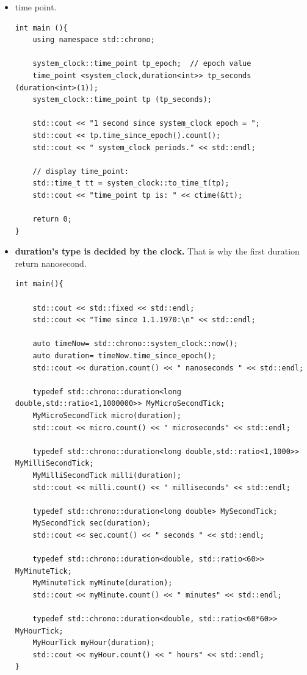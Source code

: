 \documentclass[a4paper,11pt,twoside]{book}
\begin{document}
\begin{itemize}
	\item time point.
\begin{lstlisting}[numbers=none]
int main (){
	using namespace std::chrono;
	
	system_clock::time_point tp_epoch;	// epoch value
	time_point <system_clock,duration<int>> tp_seconds (duration<int>(1));
	system_clock::time_point tp (tp_seconds);
	
	std::cout << "1 second since system_clock epoch = ";
	std::cout << tp.time_since_epoch().count();
	std::cout << " system_clock periods." << std::endl;
	
	// display time_point:
	std::time_t tt = system_clock::to_time_t(tp);
	std::cout << "time_point tp is: " << ctime(&tt);
	
	return 0;
}
\end{lstlisting}
	
	\item \textbf{duration's type is decided by the clock. } That is why the first duration return nanosecond. 
\begin{lstlisting}[numbers=none]
int main(){	
	
	std::cout << std::fixed << std::endl;
	std::cout << "Time since 1.1.1970:\n" << std::endl;
	
	auto timeNow= std::chrono::system_clock::now();
	auto duration= timeNow.time_since_epoch();
	std::cout << duration.count() << " nanoseconds " << std::endl;
	
	typedef std::chrono::duration<long double,std::ratio<1,1000000>> MyMicroSecondTick;
	MyMicroSecondTick micro(duration);
	std::cout << micro.count() << " microseconds" << std::endl;
	
	typedef std::chrono::duration<long double,std::ratio<1,1000>> MyMilliSecondTick;
	MyMilliSecondTick milli(duration);
	std::cout << milli.count() << " milliseconds" << std::endl;
	
	typedef std::chrono::duration<long double> MySecondTick;
	MySecondTick sec(duration);
	std::cout << sec.count() << " seconds " << std::endl;
	
	typedef std::chrono::duration<double, std::ratio<60>> MyMinuteTick;
	MyMinuteTick myMinute(duration);
	std::cout << myMinute.count() << " minutes" << std::endl;
	
	typedef std::chrono::duration<double, std::ratio<60*60>> MyHourTick;
	MyHourTick myHour(duration);
	std::cout << myHour.count() << " hours" << std::endl;
}
\end{lstlisting}
\end{itemize}
\end{document}
